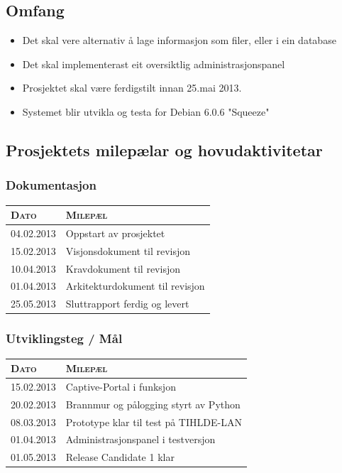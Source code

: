 \documentclass[nynorsk,12pt,a4paper]{article}
\begin{document}
\subsection{Omfang}
\begin{itemize}
	\item Det skal vere alternativ å lage informasjon som filer, eller i ein database
	\item Det skal implementerast eit oversiktlig administrasjonspanel
	\item Prosjektet skal være ferdigstilt innan 25.mai 2013.
	\item Systemet blir utvikla og testa for Debian 6.0.6 "Squeeze"
\end{itemize}

\subsection{Prosjektets milepælar og hovudaktivitetar}

\subsubsection{Dokumentasjon}
\begin{table}[h!]
	\centering
	\begin{tabular}{ l l } 
		\textsc{Dato} & \textsc{Milepæl} \\ \hline
		04.02.2013 & Oppstart av prosjektet \\ 
		15.02.2013 & Visjonsdokument til revisjon	\\ 
		10.04.2013 & Kravdokument til revisjon	\\ 
		01.04.2013 & Arkitekturdokument til revisjon \\ 
		25.05.2013 & Sluttrapport ferdig og levert	\\ 
		\hline
	\end{tabular}
\end{table}

\subsubsection{Utviklingsteg / Mål}
\begin{table}[h!]
	\centering
	\begin{tabular}{ l l }
		\textsc{Dato} & \textsc{Milepæl} \\ \hline
		15.02.2013 & Captive-Portal i funksjon \\ 
		20.02.2013 & Brannmur og pålogging styrt av Python	\\ 
		08.03.2013 & Prototype klar til test på TIHLDE-LAN \\ 
		01.04.2013 & Administrasjonspanel i testversjon \\ 
		01.05.2013 & Release Candidate 1 klar	\\ 
		\hline
	\end{tabular}
\end{table}
\end{document}
